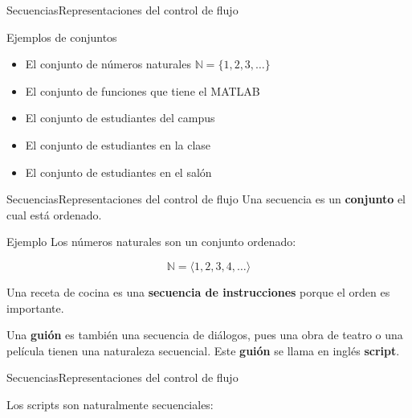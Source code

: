 \documentclass[spanish, c, handout]{beamer}
\begin{document}
\begin{frame}{Secuencias}{Representaciones del control de flujo}
    \begin{exampleblock}{Ejemplos de conjuntos}
        \begin{itemize}[<+->]
            \itemsep3.5ex
            \item El conjunto de números naturales $\mathbb{N} = \{1, 2, 3, \dots\}$
            \item El conjunto de funciones que tiene el MATLAB
            \item El conjunto de estudiantes del campus
            \item El conjunto de estudiantes en la clase
            \item El conjunto de estudiantes en el salón
        \end{itemize}
    \end{exampleblock}
\end{frame}

\begin{frame}{Secuencias}{Representaciones del control de flujo}
    Una \alert{secuencia} es un \textbf{conjunto} el cual está \alert{ordenado}. \pause

    \begin{exampleblock}{Ejemplo}
        Los números naturales son un conjunto ordenado:

        $$\mathbb{N} = \langle 1, 2, 3, 4, \dots \rangle$$
        
    \end{exampleblock} \pause

    Una receta de cocina es una \textbf{secuencia de instrucciones} porque el orden es importante. \pause
    
    Una \textbf{guión} es también una secuencia de diálogos, pues una obra de teatro o una película tienen una naturaleza secuencial.
    Este \textbf{guión} se llama en inglés \textbf{script}.
\end{frame}

\begin{frame}[fragile]{Secuencias}{Representaciones del control de flujo}

    Los \alert{scripts} son naturalmente secuenciales:

    \bigskip

    \begin{columns}
        \begin{column}{0.95\linewidth}
            
        \end{column}
    \end{columns}

\end{frame}
\end{document}
